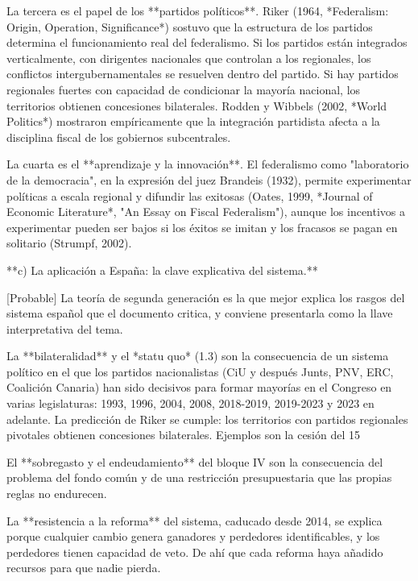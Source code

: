 \documentclass[10pt,a4paper]{article}
\begin{document}
La tercera es el papel de los **partidos políticos**. Riker (1964, *Federalism: Origin, Operation, Significance*) sostuvo que la estructura de los partidos determina el funcionamiento real del federalismo. Si los partidos están integrados verticalmente, con dirigentes nacionales que controlan a los regionales, los conflictos intergubernamentales se resuelven dentro del partido. Si hay partidos regionales fuertes con capacidad de condicionar la mayoría nacional, los territorios obtienen concesiones bilaterales. Rodden y Wibbels (2002, *World Politics*) mostraron empíricamente que la integración partidista afecta a la disciplina fiscal de los gobiernos subcentrales.

La cuarta es el **aprendizaje y la innovación**. El federalismo como "laboratorio de la democracia", en la expresión del juez Brandeis (1932), permite experimentar políticas a escala regional y difundir las exitosas (Oates, 1999, *Journal of Economic Literature*, "An Essay on Fiscal Federalism"), aunque los incentivos a experimentar pueden ser bajos si los éxitos se imitan y los fracasos se pagan en solitario (Strumpf, 2002).

**c) La aplicación a España: la clave explicativa del sistema.**

[Probable] La teoría de segunda generación es la que mejor explica los rasgos del sistema español que el documento critica, y conviene presentarla como la llave interpretativa del tema.

La **bilateralidad** y el *statu quo* (1.3) son la consecuencia de un sistema político en el que los partidos nacionalistas (CiU y después Junts, PNV, ERC, Coalición Canaria) han sido decisivos para formar mayorías en el Congreso en varias legislaturas: 1993, 1996, 2004, 2008, 2018-2019, 2019-2023 y 2023 en adelante. La predicción de Riker se cumple: los territorios con partidos regionales pivotales obtienen concesiones bilaterales. Ejemplos son la cesión del 15%

El **sobregasto y el endeudamiento** del bloque IV son la consecuencia del problema del fondo común y de una restricción presupuestaria que las propias reglas no endurecen.

La **resistencia a la reforma** del sistema, caducado desde 2014, se explica porque cualquier cambio genera ganadores y perdedores identificables, y los perdedores tienen capacidad de veto. De ahí que cada reforma haya añadido recursos para que nadie pierda.
\end{document}
